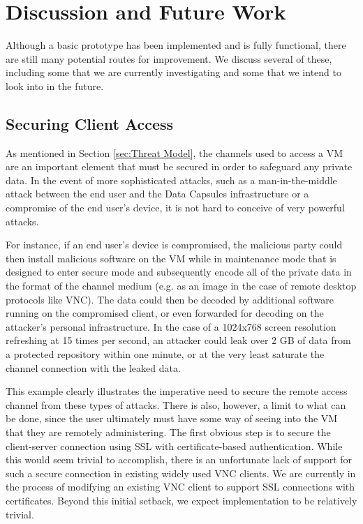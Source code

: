 \documentclass{acm_proc_article-sp}
\begin{document}
\section{Discussion and Future Work}
\label{sec:Discussion}

Although a basic prototype has been implemented and is fully functional, there
are still many potential routes for improvement.  We discuss several of these,
including some that we are currently investigating and some that we intend to
look into in the future.

\subsection{Securing Client Access}

As mentioned in Section \ref{sec:Threat Model}, the channels used to access a VM
are an important element that must be secured in order to safeguard any private
data.  In the event of more sophisticated attacks, such as a man-in-the-middle
attack between the end user and the Data Capsules infrastructure or a compromise
of the end user's device, it is not hard to conceive of very powerful attacks.

For instance, if an end user's device is compromised, the malicious party could
then install malicious software on the VM while in maintenance mode that is
designed to enter secure mode and subsequently encode all of the private data in
the format of the channel medium (e.g. as an image in the case of remote desktop
protocols like VNC).  The data could then be decoded by additional software
running on the compromised client, or even forwarded for decoding on the
attacker's personal infrastructure.  In the case of a 1024x768 screen resolution
refreshing at 15 times per second, an attacker could leak over 2 GB of data from
a protected repository within one minute, or at the very least saturate the
channel connection with the leaked data.

This example clearly illustrates the imperative need to secure the remote
access channel from these types of attacks.  There is also, however, a limit to
what can be done, since the user ultimately must have some way of seeing into
the VM that they are remotely administering.  The first obvious step is to
secure the client-server connection using SSL with certificate-based
authentication.  While this would seem trivial to accomplish, there is an
unfortunate lack of support for such a secure connection in existing widely
used VNC clients.  We are currently in the process of modifying an existing VNC
client to support SSL connections with certificates.  Beyond this initial
setback, we expect implementation to be relatively trivial.
\end{document}
